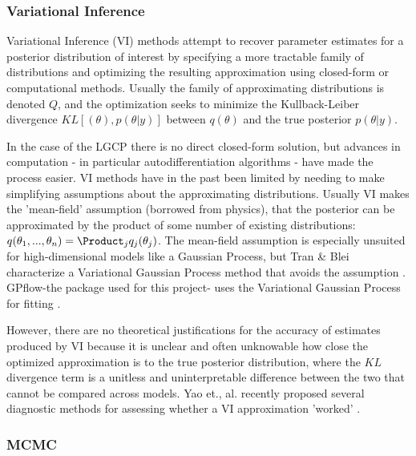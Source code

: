 \subsubsection{Variational Inference}

Variational Inference (VI) methods attempt to recover parameter estimates for a posterior distribution of interest by specifying a more tractable family of distributions and optimizing the resulting approximation using closed-form or computational methods. Usually the family of approximating distributions is denoted $Q$, and the optimization seeks to minimize the Kullback-Leiber divergence $KL[(\theta), p(\theta|y)]$ between $q(\theta)$ and the true posterior $p(\theta|y)$. \par


In the case of the LGCP there is no direct closed-form solution, but advances in computation - in particular autodifferentiation algorithms - have made the process easier. VI methods have in the past been limited by needing to make simplifying assumptions about the approximating distributions. Usually VI makes the 'mean-field' assumption (borrowed from physics), that the posterior can be approximated by the product of some number of existing distributions: $q(\theta_1,...,\theta_n)= \Product_j{q_j(\theta_j)}$. The mean-field assumption is especially unsuited for high-dimensional models like a Gaussian Process, but Tran & Blei characterize a Variational Gaussian Process method that avoids the assumption \cite{tran_2015}. GPflow-the package used for this project- uses the Variational Gaussian Process for fitting \cite{GPflow2017}.\par

However, there are no theoretical justifications for the accuracy of estimates produced by VI because it is unclear and often unknowable how close the optimized approximation is to the true posterior distribution, where the $KL$ divergence term is a unitless and uninterpretable difference between the two that cannot be compared across models. Yao et., al. recently proposed several diagnostic methods for assessing whether a VI approximation 'worked' \cite{yao_2018}.

\subsubsection{MCMC}

